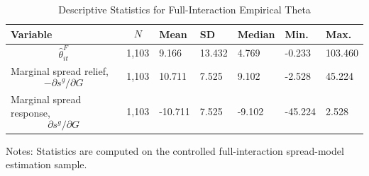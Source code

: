 \begin{table}[H]\centering
\begin{threeparttable}
\caption{Descriptive Statistics for Full-Interaction Empirical Theta}
\label{tab:theta_descriptive_stats}
\scriptsize
\begin{tabularx}{\textwidth}{lYYYYYY}
\toprule
Variable & $$N$$ & Mean & SD & Median & Min. & Max. \\
\midrule
$$\widehat{\theta}^{F}_{it}$$ & 1,103 & 9.166 & 13.432 & 4.769 & -0.233 & 103.460 \\
Marginal spread relief, $$-\partial s^g/\partial G$$ & 1,103 & 10.711 & 7.525 & 9.102 & -2.528 & 45.224 \\
Marginal spread response, $$\partial s^g/\partial G$$ & 1,103 & -10.711 & 7.525 & -9.102 & -45.224 & 2.528 \\
\bottomrule
\end{tabularx}
\begin{tablenotes}[flushleft]\footnotesize
\item Notes: Statistics are computed on the controlled full-interaction spread-model estimation sample.
\end{tablenotes}
\end{threeparttable}
\end{table}
